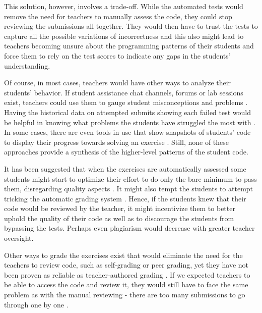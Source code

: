 This solution, however, involves a trade-off. While the automated tests would remove the need for teachers to manually assess the code, they could stop reviewing the submissions all together. They would then have to trust the tests to capture all the possible variations of incorrectness and this also might lead to teachers becoming unsure about the programming patterns of their students and force them to rely on the test scores to indicate any gaps in the students' understanding.

Of course, in most cases, teachers would have other ways to analyze their students' behavior. If student assistance chat channels, forums or lab sessions exist, teachers could use them to gauge student misconceptions and problems \cite{multi-faceted-mooc-support, glassman-reusable-feedback}. Having the historical data on attempted submits showing each failed test would be helpful in knowing what problems the students have struggled the most with \cite{glassman-reusable-feedback}. In some cases, there are even tools in use that show snapshots of students' code to display their progress towards solving an exercise \cite{snapshots}. Still, none of these approaches provide a synthesis of the higher-level patterns of the student code.

It has been suggested that when the exercises are automatically assessed some students might start to optimize their effort to do only the bare minimum to pass them, disregarding quality aspects \cite{aalto-2010-auto-ass-systems-review}. It might also tempt the students to attempt tricking the automatic grading system \cite{alamutka-2005-auto-ass-survey}. Hence, if the students knew that their code would be reviewed by the teacher, it might incentivize them to better uphold the quality of their code as well as to discourage the students from bypassing the tests. Perhaps even plagiarism would decrease with greater teacher oversight.

Other ways to grade the exercises exist that would eliminate the need for the teachers to review code, such as self-grading or peer grading, yet they have not been proven as reliable as teacher-authored grading \cite{self-peer-grading, codewebs, divide-and-correct}. If we expected teachers to be able to access the code and review it, they would still have to face the same problem as with the manual reviewing - there are too many submissions to go through one by one \cite{overcode, codewebs}.

